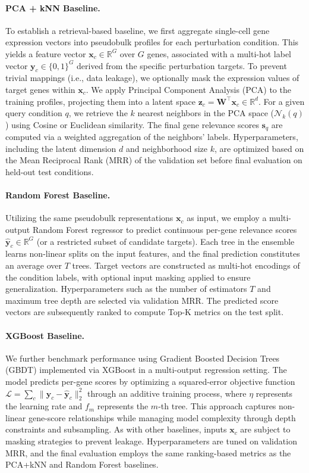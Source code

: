 \documentclass[conference]{IEEEtran}
\begin{document}
\paragraph{PCA + kNN Baseline.}
To establish a retrieval-based baseline, we first aggregate single-cell gene expression vectors into pseudobulk profiles for each perturbation condition. This yields a feature vector $\mathbf{x}_c \in \mathbb{R}^G$ over $G$ genes, associated with a multi-hot label vector $\mathbf{y}_c \in \{0,1\}^G$ derived from the specific perturbation targets. To prevent trivial mappings (i.e., data leakage), we optionally mask the expression values of target genes within $\mathbf{x}_c$. We apply Principal Component Analysis (PCA) to the training profiles, projecting them into a latent space $\mathbf{z}_c = \mathbf{W}^\top \mathbf{x}_c \in \mathbb{R}^d$. For a given query condition $q$, we retrieve the $k$ nearest neighbors in the PCA space ($\mathcal{N}_k(q)$) using Cosine or Euclidean similarity. The final gene relevance scores $\mathbf{s}_q$ are computed via a weighted aggregation of the neighbors' labels. Hyperparameters, including the latent dimension $d$ and neighborhood size $k$, are optimized based on the Mean Reciprocal Rank (MRR) of the validation set before final evaluation on held-out test conditions.

\paragraph{Random Forest Baseline.}
Utilizing the same pseudobulk representations $\mathbf{x}_c$ as input, we employ a multi-output Random Forest regressor to predict continuous per-gene relevance scores $\hat{\mathbf{y}}_c \in \mathbb{R}^G$ (or a restricted subset of candidate targets). Each tree in the ensemble learns non-linear splits on the input features, and the final prediction constitutes an average over $T$ trees. Target vectors are constructed as multi-hot encodings of the condition labels, with optional input masking applied to ensure generalization. Hyperparameters such as the number of estimators $T$ and maximum tree depth are selected via validation MRR. The predicted score vectors are subsequently ranked to compute Top-K metrics on the test split.

\paragraph{XGBoost Baseline.}
We further benchmark performance using Gradient Boosted Decision Trees (GBDT) implemented via XGBoost in a multi-output regression setting. The model predicts per-gene scores by optimizing a squared-error objective function $\mathcal{L} = \sum_c \|\mathbf{y}_c - \hat{\mathbf{y}}_c\|_2^2$ through an additive training process, where $\eta$ represents the learning rate and $f_m$ represents the $m$-th tree. This approach captures non-linear gene-score relationships while managing model complexity through depth constraints and subsampling. As with other baselines, inputs $\mathbf{x}_c$ are subject to masking strategies to prevent leakage. Hyperparameters are tuned on validation MRR, and the final evaluation employs the same ranking-based metrics as the PCA+kNN and Random Forest baselines.
\end{document}
